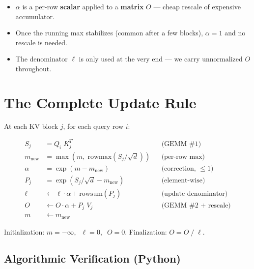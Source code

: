 \documentclass[11pt, letterpaper]{article}
\begin{document}
\begin{itemize}[leftmargin=1.5em, itemsep=0.3em]
\item $\alpha$ is a per-row \textbf{scalar} applied to a \textbf{matrix} $O$ --- cheap rescale of expensive accumulator.
\item Once the running max stabilizes (common after a few blocks), $\alpha = 1$ and no rescale is needed.
\item The denominator $\ell$ is only used at the very end --- we carry unnormalized $O$ throughout.
\end{itemize}

\section{The Complete Update Rule}

At each KV block $j$, for each query row $i$:

\begin{equation}
\boxed{
\begin{aligned}
S_j &= Q_i \; K_j^T & & \text{(GEMM \#1)} \\
m_{\text{new}} &= \max(m, \;\text{rowmax}(S_j / \sqrt{d})) & & \text{(per-row max)} \\
\alpha &= \exp(m - m_{\text{new}}) & & \text{(correction, } \leq 1 \text{)} \\
P_j &= \exp(S_j / \sqrt{d} - m_{\text{new}}) & & \text{(element-wise)} \\
\ell &\leftarrow \ell \cdot \alpha + \text{rowsum}(P_j) & & \text{(update denominator)} \\
O &\leftarrow O \cdot \alpha + P_j \; V_j & & \text{(GEMM \#2 + rescale)} \\
m &\leftarrow m_{\text{new}} & &
\end{aligned}
}
\end{equation}

Initialization: $m = -\infty, \;\; \ell = 0, \;\; O = 0$. \quad Finalization: $O = O \;/\; \ell$.

\subsection{Algorithmic Verification (Python)}
\end{document}
